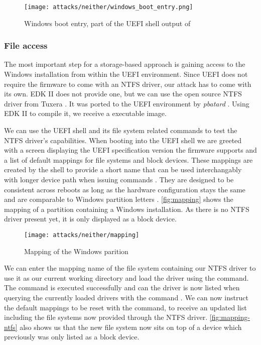 \begin{figure}[htb]
    \centering
    \texttt{[image: attacks/neither/windows\_boot\_entry.png]}
    \caption{Windows boot entry, part of the \ac{UEFI} shell output of }
    \label{fig:windows-boot-entry}
\end{figure}

\subsubsection{File access}

The most important step for a storage-based approach is gaining access to the Windows installation from within the \ac{UEFI} environment.
Since \ac{UEFI} does not require the firmware to come with an \ac{NTFS} driver, our attack has to come with its own.
\ac{EDK} II does not provide one, but we can use the open source \ac{NTFS} driver  from Tuxera \cite{ntfs-3g}.
It was ported to the \ac{UEFI} environment by \emph{pbatard} \cite{ntfs-3g-uefi}.
Using \ac{EDK} II to compile it, we receive a  executable image.

We can use the \ac{UEFI} shell and its file system related commands to test the \ac{NTFS} driver's capabilities.
When booting into the \ac{UEFI} shell we are greeted with a screen displaying the \ac{UEFI} specification version the firmware supports and a list of default mappings for file systems and block devices.
These mappings are created by the shell to provide a short name that can be used interchangably with longer device path when issuing commands \cite[Section 3.7.2]{uefi-shell-spec}.
They are designed to be consistent across reboots as long as the hardware configuration stays the same and are comparable to Windows partition letters \cite[Appendix A]{uefi-shell-spec}.
\autoref{fig:mapping} shows the mapping of a partition containing a Windows installation.
As there is no \ac{NTFS} driver present yet, it is only displayed as a block device.

\begin{figure}[htb]
    \centering
    \texttt{[image: attacks/neither/mapping]}
    \caption{Mapping of the Windows parition}
    \label{fig:mapping}
\end{figure}

We can enter the mapping name of the file system containing our \ac{NTFS} driver to use it as our current working directory and load the driver using the  command.
The command is executed successfully and can the driver is now listed when querying the currently loaded drivers with the command .
We can now instruct the default mappings to be reset with the  command, to receive an updated list including the file systems now provided through the \ac{NTFS} driver.
\autoref{fig:mapping-ntfs} also shows us that the new file system now sits on top of a device which previously was only listed as a block device.

